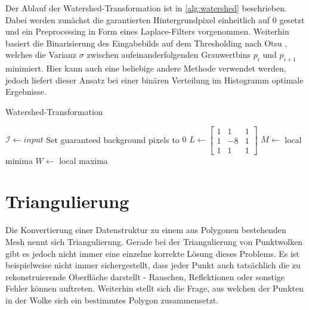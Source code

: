 Der Ablauf der Watershed-Transformation ist in \autoref{alg:watershed} beschrieben.
Dabei werden zunächst die garantierten Hintergrundpixel einheitlich auf 0 gesetzt und ein Preprocessing in Form eines Laplace-Filters vorgenommen.
Weiterhin basiert die Binarisierung des Eingabebilds auf dem Thresholding nach Otsu \cite{otsu1979threshold}, welches die Varianz $\sigma$ zwischen aufeinanderfolgenden Grauwertbins $p_i$ und $p_{i+1}$ minimiert.
Hier kann auch eine beliebige andere Methode verwendet werden, jedoch liefert dieser Ansatz bei einer binären Verteilung im Histogramm optimale Ergebnisse.

\begin{algorithm}
\caption[Watershed-Transformation]{Watershed-Transformation \cite{openCVwatershed}}
\label{alg:watershed}
\begin{algorithmic}
\State $\mathcal{I} \gets input$
\State Set guaranteed background pixels to $0$
\State $L \gets \begin{bmatrix}1 & 1 & 1\\1 & -8 & 1\\1 & 1 & 1\end{bmatrix}$
\State {}
\State {}
\State {}
\State $M \gets$ local minima
\State $W \gets$ local maxima
\State {}
	\State {}
\EndFor
\end{algorithmic}
\end{algorithm}


\section{Triangulierung}
\label{sec:triangulation}

Die Konvertierung einer Datenstruktur zu einem aus Polygonen bestehenden Mesh nennt sich Triangulierung.
Gerade bei der Triangulierung von Punktwolken gibt es jedoch nicht immer eine einzelne korrekte Lösung dieses Problems.
Es ist beispielweise nicht immer sichergestellt, dass jeder Punkt auch tatsächlich die zu rekonstruierende Oberfläche darstellt - Rauschen, Reflektionen oder sonstige Fehler können auftreten.
Weiterhin stellt sich die Frage, aus welchen der Punkten in der Wolke sich ein bestimmtes Polygon zusammensetzt.

